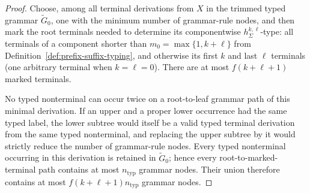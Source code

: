 \documentclass[11pt]{article}
\numberwithin{equation}{section}
\theoremstyle{plain}
\theoremstyle{definition}
\theoremstyle{remark}
\begin{document}
\begin{proof}
Choose, among all terminal derivations from $X$ in the trimmed typed grammar
$\widetilde G_0$, one with the minimum number of grammar-rule nodes, and then mark the root terminals needed to
determine its componentwise $h_\Sigma^{k,\ell}$-type: all terminals of a
component shorter than $m_0=\max\{1,k+\ell\}$ from
Definition~\ref{def:prefix-suffix-typing}, and otherwise its first $k$ and
last $\ell$ terminals (one arbitrary terminal when $k=\ell=0$).  There are at most $f(k+\ell+1)$ marked terminals.

No typed nonterminal can occur twice on a root-to-leaf grammar path of this minimal
derivation.  If an upper and a proper lower occurrence had the same typed
label, the lower subtree would itself be a valid typed terminal derivation from
the same typed nonterminal, and replacing the upper subtree by it would strictly reduce
the number of grammar-rule nodes.  Every typed nonterminal occurring in this derivation is retained in $\widetilde G_0$; hence every root-to-marked-terminal path
contains at most $n_{\mathrm{typ}}$ grammar nodes.  Their union therefore contains at most
$f(k+\ell+1)n_{\mathrm{typ}}$ grammar nodes.


\end{proof}
\end{document}
